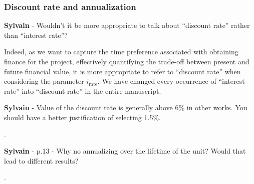 \documentclass[12pt,a4paper]{article}
\begin{document}
\noindent 

\begin{mdframed}[style=manuscript] %

\end{mdframed}

\subsubsection{Discount rate and annualization}

\begin{mdframed}[style=comment] %
{\color{purple} \textbf{Sylvain}} - Wouldn't it be more appropriate to talk about ``discount rate'' rather than ``interest rate''?
\end{mdframed}

\noindent Indeed, as we want to capture the time preference associated with obtaining finance for the project, effectively quantifying the trade-off between present and future financial value, it is more appropriate to refer to ``discount rate'' when considering the parameter $i_{\text{rate}}$. We have changed every occurrence of ``interest rate'' into ``discount rate'' {\color{blue}in the entire manuscript}.

\begin{mdframed}[style=comment] %
{\color{purple} \textbf{Sylvain}} - Value of the discount rate is generally above 6\% in other works. You should have a better justification of selecting 1.5\%.
\end{mdframed}

\noindent  {\color{blue} }.

\begin{mdframed}[style=manuscript] %

\end{mdframed}

\begin{mdframed}[style=comment] %
{\color{purple} \textbf{Sylvain}} - p.13 - Why no annualizing over the lifetime of the unit? Would that lead to different results? 
\end{mdframed}

\noindent {\color{blue} }.

\begin{mdframed}[style=manuscript] %

\end{mdframed}
\end{document}
